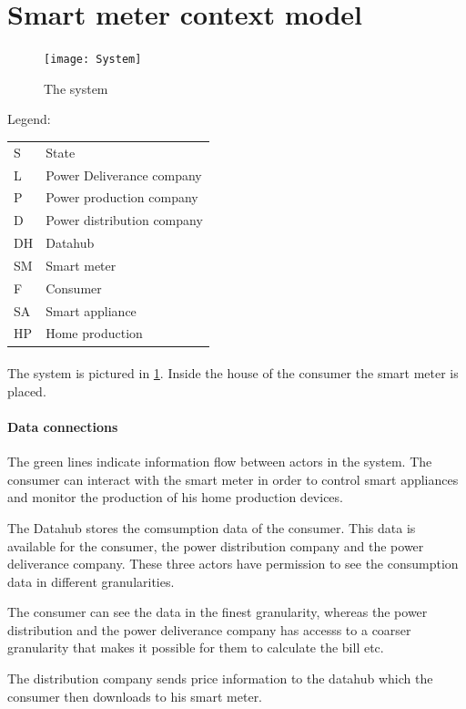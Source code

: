 \section{Smart meter context model}

\begin{figure}
  \texttt{[image: System]}
  \caption{The system}
  \label{contextual:system}
\end{figure}
Legend:

\begin{tabular}{l | l}
  S  & State \\
  L & Power Deliverance company\\
  P & Power production company\\
  D & Power distribution company\\
  DH & Datahub \\
  SM & Smart meter\\
  F & Consumer\\
  SA & Smart appliance\\
  HP & Home production\\
\end{tabular}


\paragraph{} The system is pictured in \cref{contextual:system}.
Inside the house of the consumer the smart meter is placed.

\paragraph{Data connections}
The green lines indicate information flow between actors in the system.
The consumer can interact with the smart meter in order to control smart appliances and monitor the production of his home production devices.

The Datahub stores the comsumption data of the consumer.
This data is available for the consumer, the power distribution company and the power deliverance company.
These three actors have permission to see the consumption data in different granularities.

The consumer can see the data in the finest granularity, whereas the power distribution and the power deliverance company has accesss to a coarser granularity that makes it possible for them to calculate the bill etc.

The distribution company sends price information to the datahub which the consumer then downloads to his smart meter.

